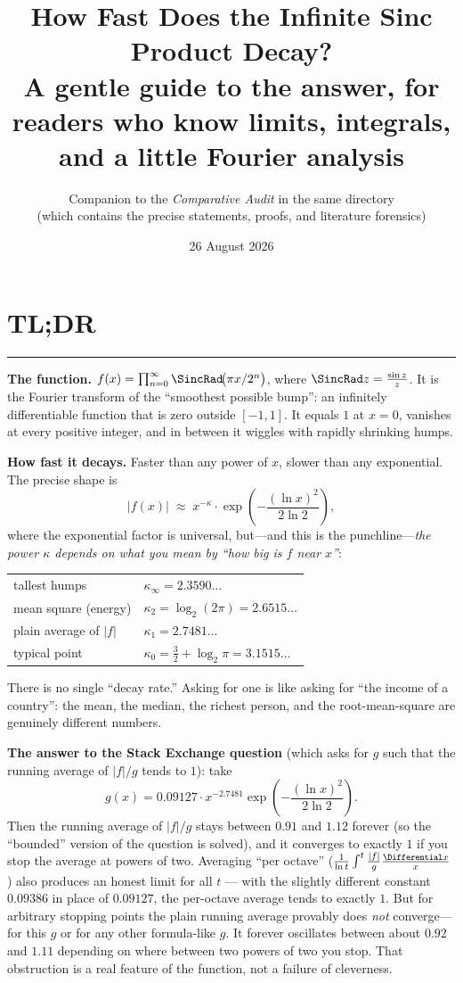 \documentclass[11pt,oneside]{article}
\title{\bfseries How Fast Does the Infinite Sinc Product Decay?\\[0.35em]
\large A gentle guide to the answer, for readers who know limits,
integrals, and a little Fourier analysis}
\author{Companion to the \emph{Comparative Audit} in the same directory\\
\small (which contains the precise statements, proofs, and literature forensics)}
\date{26 August 2026}
\theoremstyle{remark}
\begin{document}
\maketitle

\section*{TL;DR}

\hrule\vspace{0.9em}
\noindent
\textbf{The function.}
$f(x)=\prod_{n=0}^{\infty}\SincRad\!\bigl(\pi x/2^n\bigr)$, where
$\SincRad z=\frac{\sin z}{z}$.  It is the Fourier transform of the
``smoothest possible bump'': an infinitely differentiable function that
is zero outside $[-1,1]$.  It equals $1$ at $x=0$, vanishes at every
positive integer, and in between it wiggles with rapidly shrinking
humps.

\textbf{How fast it decays.}
Faster than any power of $x$, slower than any exponential.  The precise
shape is
\[
 |f(x)|\;\approx\;
 x^{-\kappa}\cdot
 \exp\!\left(-\frac{(\ln x)^2}{2\ln 2}\right),
\]
where the exponential factor is universal, but---and this is the
punchline---\emph{the power $\kappa$ depends on what you mean by
``how big is $f$ near $x$''}:
\begin{center}
\begin{tabular}{@{}ll@{}}
tallest humps & $\kappa_\infty=2.3590\ldots$\\
mean square (energy) & $\kappa_2=\log_2(2\pi)=2.6515\ldots$\\
plain average of $|f|$ & $\kappa_1=2.7481\ldots$\\
typical point & $\kappa_0=\tfrac32+\log_2\pi=3.1515\ldots$
\end{tabular}
\end{center}
There is no single ``decay rate.''  Asking for one is like asking for
``the income of a country'': the mean, the median, the richest person,
and the root-mean-square are genuinely different numbers.

\textbf{The answer to the Stack Exchange question} (which asks for
$g$ such that the running average of $|f|/g$ tends to $1$): take
\[
 g(x)=0.09127\cdot x^{-2.7481}
 \exp\!\left(-\frac{(\ln x)^2}{2\ln 2}\right).
\]
Then the running average of $|f|/g$ stays between $0.91$ and $1.12$
forever (so the ``bounded'' version of the question is solved), and it
converges to exactly $1$ if you stop the average at powers of two.
Averaging ``per octave'' ($\frac1{\ln t}\int^t\frac{|f|}{g}
\frac{\Differential x}{x}$) also produces an honest limit for all $t$ --- with
the slightly different constant $0.09386$ in place of $0.09127$, the
per-octave average tends to exactly $1$.  But for arbitrary stopping
points the plain running average
provably does \emph{not} converge---for this $g$ or for any other
formula-like $g$.  It forever oscillates between about
$0.92$ and $1.11$ depending on where between two powers of two you
stop.  That obstruction is a real feature of the function, not a
failure of cleverness.
\end{document}
